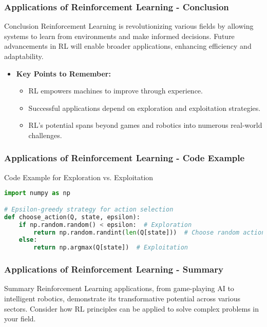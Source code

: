 \documentclass[aspectratio=169]{beamer}
\begin{document}
\begin{frame}[fragile]
    \frametitle{Applications of Reinforcement Learning - Conclusion}
    \begin{block}{Conclusion}
        Reinforcement Learning is revolutionizing various fields by allowing systems to learn from environments and make informed decisions. Future advancements in RL will enable broader applications, enhancing efficiency and adaptability.
    \end{block}

    \begin{itemize}
        \item \textbf{Key Points to Remember:}
        \begin{itemize}
            \item RL empowers machines to improve through experience.
            \item Successful applications depend on exploration and exploitation strategies.
            \item RL's potential spans beyond games and robotics into numerous real-world challenges.
        \end{itemize}
    \end{itemize}
\end{frame}

\begin{frame}[fragile]
    \frametitle{Applications of Reinforcement Learning - Code Example}
    \begin{block}{Code Example for Exploration vs. Exploitation}
    \begin{lstlisting}[language=Python]
import numpy as np

# Epsilon-greedy strategy for action selection
def choose_action(Q, state, epsilon):
    if np.random.random() < epsilon:  # Exploration
        return np.random.randint(len(Q[state]))  # Choose random action
    else:
        return np.argmax(Q[state])  # Exploitation
    \end{lstlisting}
    \end{block}
\end{frame}

\begin{frame}[fragile]
    \frametitle{Applications of Reinforcement Learning - Summary}
    \begin{block}{Summary}
        Reinforcement Learning applications, from game-playing AI to intelligent robotics, demonstrate its transformative potential across various sectors. Consider how RL principles can be applied to solve complex problems in your field.
    \end{block}
\end{frame}
\end{document}
